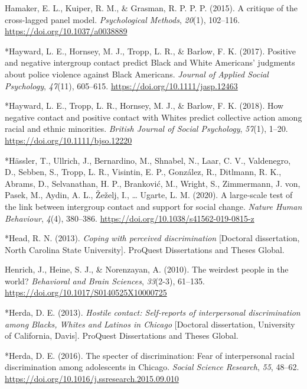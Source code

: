 \documentclass[12pt, letterpaper]{article}
\begin{document}
\leavevmode\hypertarget{ref-hamaker_critique_2015}{}%
Hamaker, E. L., Kuiper, R. M., \& Grasman, R. P. P. P. (2015). A
critique of the cross-lagged panel model. \emph{Psychological Methods},
\emph{20}(1), 102--116. \url{https://doi.org/10.1037/a0038889}

\leavevmode\hypertarget{ref-4003}{}%
*Hayward, L. E., Hornsey, M. J., Tropp, L. R., \& Barlow, F. K. (2017).
Positive and negative intergroup contact predict Black and White
Americans' judgments about police violence against Black Americans.
\emph{Journal of Applied Social Psychology}, \emph{47}(11), 605--615.
\url{https://doi.org/10.1111/jasp.12463}

\leavevmode\hypertarget{ref-2309}{}%
*Hayward, L. E., Tropp, L. R., Hornsey, M. J., \& Barlow, F. K. (2018).
How negative contact and positive contact with Whites predict collective
action among racial and ethnic minorities. \emph{British Journal of
Social Psychology}, \emph{57}(1), 1--20.
\url{https://doi.org/10.1111/bjso.12220}

\leavevmode\hypertarget{ref-3054}{}%
*Hässler, T., Ullrich, J., Bernardino, M., Shnabel, N., Laar, C. V.,
Valdenegro, D., Sebben, S., Tropp, L. R., Visintin, E. P., González, R.,
Ditlmann, R. K., Abrams, D., Selvanathan, H. P., Branković, M., Wright,
S., Zimmermann, J. von, Pasek, M., Aydin, A. L., Žeželj, I., \ldots{}
Ugarte, L. M. (2020). A large-scale test of the link between intergroup
contact and support for social change. \emph{Nature Human Behaviour},
\emph{4}(4), 380--386. \url{https://doi.org/10.1038/s41562-019-0815-z}

\leavevmode\hypertarget{ref-1407}{}%
*Head, R. N. (2013). \emph{Coping with perceived discrimination}
{[}Doctoral dissertation, North Carolina State University{]}. ProQuest
Dissertations and Theses Global.

\leavevmode\hypertarget{ref-henrich_weirdest_2010}{}%
Henrich, J., Heine, S. J., \& Norenzayan, A. (2010). The weirdest people
in the world? \emph{Behavioral and Brain Sciences}, \emph{33}(2-3),
61--135. \url{https://doi.org/10.1017/S0140525X10000725}

\leavevmode\hypertarget{ref-1494}{}%
*Herda, D. E. (2013). \emph{Hostile contact: Self-reports of
interpersonal discrimination among Blacks, Whites and Latinos in
Chicago} {[}Doctoral dissertation, University of California, Davis{]}.
ProQuest Dissertations and Theses Global.

\leavevmode\hypertarget{ref-324}{}%
*Herda, D. E. (2016). The specter of discrimination: Fear of
interpersonal racial discrimination among adolescents in Chicago.
\emph{Social Science Research}, \emph{55}, 48--62.
\url{https://doi.org/10.1016/j.ssresearch.2015.09.010}
\end{document}
